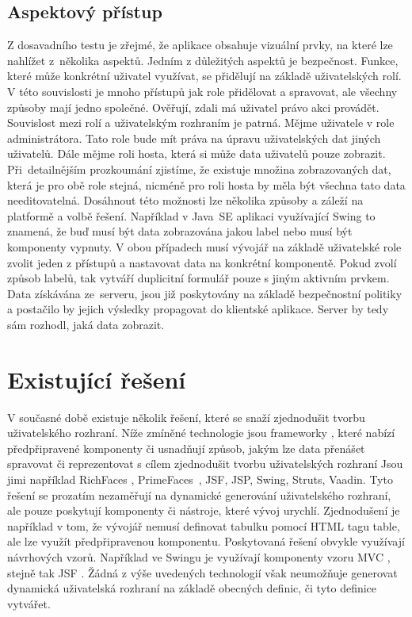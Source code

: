 \subsection{Aspektový přístup}
Z dosavadního testu je zřejmé, že aplikace obsahuje vizuální prvky, na které lze nahlížet z~několika aspektů. Jedním z důležitých aspektů je bezpečnost. Funkce, které může konkrétní uživatel využívat, se přidělují na základě uživatelských rolí. V této souvislosti je mnoho přístupů jak role přidělovat a spravovat, ale všechny způsoby mají jedno společné. Ověřují, zdali má uživatel právo akci provádět. Souvislost mezi rolí a uživatelským rozhraním je patrná. Mějme uživatele v role administrátora. Tato role bude mít práva na úpravu uživatelských dat jiných uživatelů. Dále mějme roli hosta, která si může data uživatelů pouze zobrazit. Při~detailnějším prozkoumání zjistíme, že existuje množina zobrazovaných dat, která je pro obě role stejná, nicméně pro roli hosta by měla být všechna tato data needitovatelná. Dosáhnout této možnosti lze několika způsoby a záleží na platformě a volbě řešení. Například v Java~SE aplikaci využívající Swing to znamená, že buď musí být data zobrazována jakou label nebo musí být komponenty vypnuty. V obou případech musí vývojář na základě uživatelské role zvolit jeden z přístupů a nastavovat data na konkrétní komponentě. Pokud zvolí způsob labelů, tak vytváří duplicitní formulář pouze s jiným aktivním prvkem. Data získávána ze~serveru, jsou již poskytovány na základě bezpečnostní politiky a postačilo by jejich výsledky propagovat do klientské aplikace. Server by tedy sám rozhodl, jaká data zobrazit.
\section{Existující řešení}
V současné době existuje několik řešení, které se snaží zjednodušit tvorbu uživatelského rozhraní. Níže zmíněné technologie jsou frameworky \cite{framework}, které nabízí předpřipravené komponenty či usnadňují způsob, jakým lze data přenášet spravovat či reprezentovat s cílem zjednodušit tvorbu uživatelských rozhraní Jsou jimi například RichFaces \cite{richfaces}, PrimeFaces~\cite{primefaces}, JSF, JSP, Swing, Struts, Vaadin. Tyto řešení se prozatím nezaměřují na dynamické generování uživatelského rozhraní, ale pouze poskytují komponenty či nástroje, které vývoj urychlí. Zjednodušení je například v tom, že vývojář nemusí definovat tabulku pomocí HTML tagu table, ale lze využít předpřipravenou komponentu. Poskytovaná řešení obvykle využívají návrhových vzorů. Například ve Swingu je využívají komponenty vzoru MVC \cite{fowler}, stejně tak JSF \cite{javaEETutorial}. Žádná z výše uvedených technologií však neumožňuje generovat dynamická uživatelská rozhraní na základě obecných definic, či tyto definice vytvářet.
